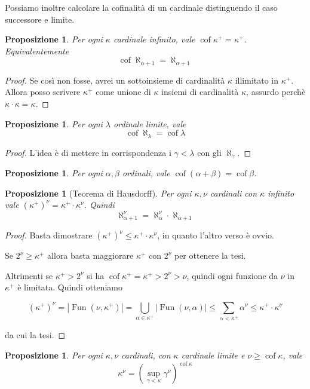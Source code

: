 \documentclass[a4paper,10pt,oneside]{article}
\DeclareMathOperator{\cof}{cof}
\DeclareMathOperator{\Fun}{Fun}
\newcommand{\abs}[1]{\left|#1\right|}
\theoremstyle{plain}
\newtheorem{myprop}[mytheorem]{Proposizione}
\theoremstyle{definition}
\theoremstyle{remark}
\begin{document}
Possiamo inoltre calcolare la cofinalità di un cardinale distinguendo il caso successore e limite.
\begin{myprop}
 Per ogni $\kappa$ cardinale infinito, vale $\cof\kappa^+ = \kappa^+$. Equivalentemente \[\cof\aleph_{\alpha+1}=\aleph_{\alpha+1}\]
\end{myprop}
\begin{proof}
 Se così non fosse, avrei un sottoinsieme di cardinalità $\kappa$ illimitato in $\kappa^+$. Allora posso scrivere $\kappa^+$ come unione di $\kappa$ insiemi di cardinalità $\kappa$, assurdo perchè $\kappa\cdot\kappa=\kappa$.
\end{proof}
\begin{myprop}
 Per ogni $\lambda$ ordinale limite, vale \[\cof \aleph_\lambda =\cof \lambda\]
\end{myprop}
\begin{proof}
 L'idea è di mettere in corrispondenza i $\gamma < \lambda$ con gli $\aleph_\gamma$.
\end{proof}

\begin{myprop}
 Per ogni $\alpha, \beta$ ordinali, vale $\cof(\alpha+\beta) = \cof \beta$.
\end{myprop}

\begin{myprop}[Teorema di Hausdorff]
 Per ogni $\kappa,\nu$ cardinali con $\kappa$ infinito vale ${\left(\kappa^+\right)}^\nu=\kappa^+\cdot \kappa^\nu$. Quindi
 \[\aleph_{\alpha+1}^\nu=\aleph_{\alpha}^\nu\cdot \aleph_{\alpha+1}\]
\end{myprop}
\begin{proof}
 Basta dimostrare ${\left(\kappa^+\right)}^\nu \le\kappa^+\cdot \kappa^\nu$, in quanto l'altro verso è ovvio. 
 
 Se $2^\nu \ge \kappa^+$ allora basta maggiorare $\kappa^+$ con $2^\nu$ per ottenere la tesi.
 
 Altrimenti se $\kappa^+>2^\nu$ si ha $ \cof\kappa^+ =\kappa^+>2^\nu>\nu $, quindi ogni funzione da $\nu$ in $\kappa^+$ è limitata. Quindi otteniamo
 
 \[{\left(\kappa^+\right)}^\nu = \abs{\Fun(\nu,\kappa^+)} = \bigcup_{\alpha\in \kappa^+} \abs{\Fun(\nu,\alpha)} \le \sum_{\alpha<\kappa^+} \alpha^\nu \le \kappa^+\cdot \kappa^\nu\]
 
 da cui la tesi.
\end{proof}

\begin{myprop}
 Per ogni $\kappa,\nu$ cardinali, con $\kappa$ cardinale limite e $\nu \ge \cof \kappa$, vale \[\kappa^\nu={\left(\sup_{\gamma<\kappa}\gamma^\nu\right)}^{\cof\kappa}\]
\end{myprop}
\end{document}
